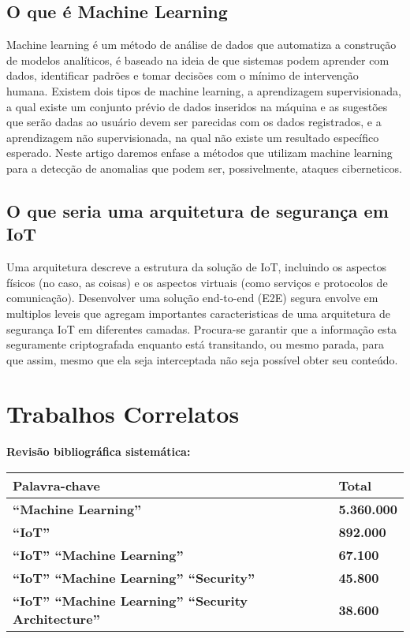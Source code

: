 \documentclass[article]{abntex2}
\begin{document}
\subsection{O que é Machine Learning}
Machine learning é um método de análise de dados que automatiza a construção de modelos analíticos, é baseado na ideia de que sistemas podem aprender com dados, identificar padrões e tomar decisões com o mínimo de intervenção humana. Existem dois tipos de machine learning, a aprendizagem supervisionada, a qual existe um conjunto prévio de dados inseridos na máquina e as sugestões que serão dadas ao usuário devem ser parecidas com os dados registrados, e a aprendizagem não supervisionada, na qual não existe um resultado específico esperado. Neste artigo daremos enfase a métodos que utilizam machine learning para a detecção de anomalias que podem ser, possivelmente, ataques ciberneticos.
\subsection{O que seria uma arquitetura de segurança em IoT}
Uma arquitetura descreve a estrutura da solução de IoT, incluindo os aspectos físicos (no caso, as coisas) e os aspectos virtuais (como serviços e protocolos de comunicação). Desenvolver uma solução end-to-end (E2E) segura envolve em multiplos leveis que agregam importantes caracteristicas de uma arquitetura de segurança IoT em diferentes camadas. Procura-se garantir que a informação esta seguramente criptografada enquanto está transitando, ou mesmo parada, para que assim, mesmo que ela seja interceptada não seja possível obter seu conteúdo.
\section{Trabalhos Correlatos}
\textbf{Revisão bibliográfica sistemática:}\\
\begin{tabular}{l l}
    \toprule
    \textbf{Palavra-chave}& \textbf{Total}  \\
    \midrule
    \textbf{``Machine Learning''}& \textbf{ 5.360.000 }\\
    \textbf{``IoT''}& \textbf{ 892.000 } \\
    \textbf{``IoT'' ``Machine Learning''}& \textbf{ 67.100 }\\
    \textbf{``IoT'' ``Machine Learning'' ``Security''}& \textbf{ 45.800 } \\
    \textbf{``IoT'' ``Machine Learning'' ``Security Architecture''}& \textbf{ 38.600 } \\
    \bottomrule
\end{tabular}
\end{document}

